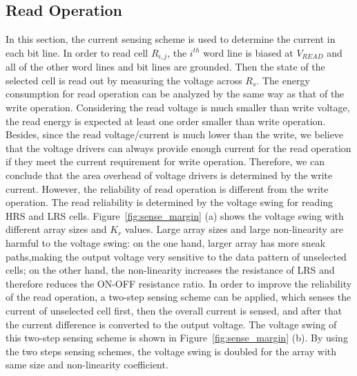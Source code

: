 \subsection{Read Operation}
In this section, the current sensing scheme is used to determine the current in each bit line. In order to read cell $R_{i,j}$, the $i^{th}$ word line is biased at $V_{READ}$ and all of the other word lines and bit lines are grounded. Then the state of the selected cell is read out by measuring the voltage across $R_s$. The energy consumption for read operation can be analyzed by the same way as that of the write operation. Considering the read voltage is much smaller than write voltage, the read energy is expected at least one order smaller than write operation. Besides, since the read voltage/current is much lower than the write, we believe that the voltage drivers can always provide enough current for the read operation if they meet the current requirement for write operation. Therefore, we can conclude that the area overhead of voltage drivers is determined by the write current. However, the reliability of read operation is different from the write operation. The read reliability is determined by the voltage swing for reading HRS and LRS cells. Figure~\ref{fig:sense_margin} (a) shows the voltage swing with different array sizes and $K_r$ values. Large array sizes and large non-linearity are harmful to the voltage swing: on the one hand, larger array has more sneak paths,making the output voltage very sensitive to the data pattern of unselected cells; on the other hand, the non-linearity increases the resistance of LRS and therefore reduces the ON-OFF resistance ratio. In order to improve the reliability of the read operation, a two-step sensing scheme can be applied, which senses the current of unselected cell first, then the overall current is sensed, and after that the current difference is converted to the output voltage. The voltage swing of this two-step sensing scheme is shown in Figure~\ref{fig:sense_margin} (b). By using the two steps sensing schemes, the voltage swing is doubled for the array with same size and non-linearity coefficient.

%

